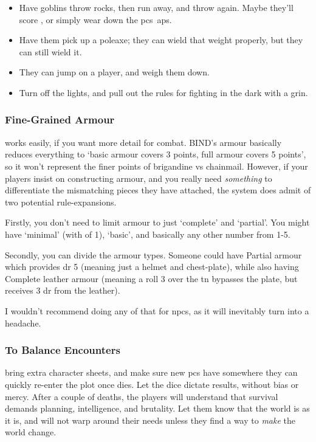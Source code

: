 \begin{multicols}{2}
\begin{itemize}
  \item
  Have goblins throw rocks, then run away, and throw again.
  Maybe they'll score , or simply wear down the \glspl{pc}~\glspl{ap}.
  \item
  Have them pick up a poleaxe; they can wield that weight properly, but they can still wield it.
  \item
  They can jump on a player, and weigh them down.
  \item
  Turn off the lights, and pull out the rules for fighting in the dark with a grin.%
\end{itemize}

\subsubsection{Fine-Grained Armour}
works easily, if you want more detail for combat.
BIND's armour basically reduces everything to `basic armour covers 3 points, full armour covers 5 points', so it won't represent the finer points of brigandine vs chainmail.
However, if your players insist on constructing armour, and you really need \emph{something} to differentiate the mismatching pieces they have attached, the system does admit of two potential rule-expansions.

Firstly, you don't need to limit armour to just `complete' and `partial'.
You might have `minimal' (with  of 1), `basic', and basically any other number from 1-5.

Secondly, you can divide the armour types.
Someone could have Partial armour which provides \gls{dr} 5 (meaning just a helmet and chest-plate), while also having Complete leather armour (meaning a roll 3 over the \gls{tn} bypasses the plate, but receives 3 \gls{dr} from the leather).

I wouldn't recommend doing any of that for \glspl{npc}, as it will inevitably turn into a headache.

\subsubsection{To Balance Encounters}
bring extra character sheets, and make sure new \glspl{pc} have somewhere they can quickly re-enter the plot once  dies.
Let the dice dictate results, without bias or mercy.
After a couple of deaths, the players will understand that survival demands planning, intelligence, and brutality.
Let them know that the world is as it is, and will not warp around their needs unless they find a way to \emph{make} the world change.


\end{multicols}
